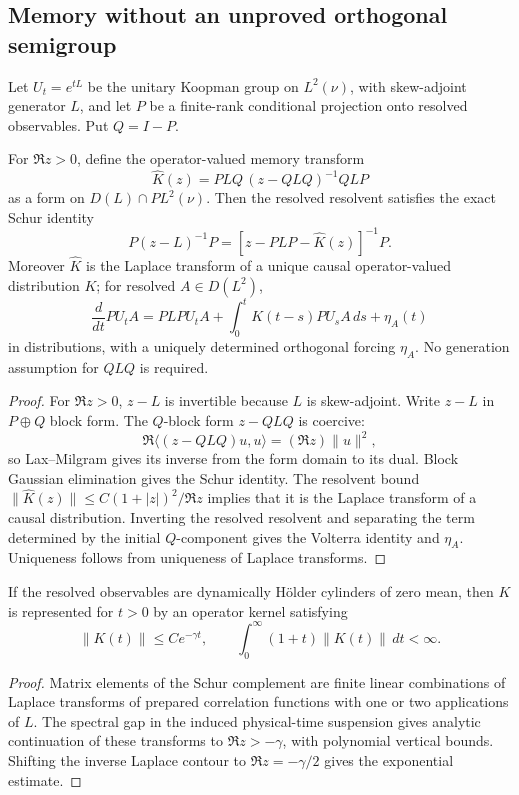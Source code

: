\subsection{Memory without an unproved orthogonal semigroup}

Let \(U_t=e^{tL}\) be the unitary Koopman group on \(L^2(\nu)\), with
skew-adjoint generator \(L\), and let \(P\) be a finite-rank conditional
projection onto resolved observables.  Put \(Q=I-P\).

\begin{theorem}
\label{thm:rr2-a4-resolvent-memory}
For \(\Re z>0\), define the operator-valued memory transform
\[
 \widehat K(z)=PLQ\,(z-QLQ)^{-1}QLP
\]
as a form on \(D(L)\cap PL^2(\nu)\).  Then the resolved resolvent satisfies
the exact Schur identity
\[
 P(z-L)^{-1}P
 =
 \left[z-PLP-\widehat K(z)\right]^{-1}P.
\]
Moreover \(\widehat K\) is the Laplace transform of a unique causal
operator-valued distribution \(K\); for resolved \(A\in D(L^2)\),
\[
 \frac d{dt}PU_tA
 =
 PLPU_tA+\int_0^tK(t-s)PU_sA\,ds+\eta_A(t)
\]
in distributions, with a uniquely determined orthogonal forcing
\(\eta_A\).  No generation assumption for \(QLQ\) is required.
\end{theorem}

\begin{proof}
For \(\Re z>0\), \(z-L\) is invertible because \(L\) is skew-adjoint.
Write \(z-L\) in \(P\oplus Q\) block form.  The \(Q\)-block form
\(z-QLQ\) is coercive:
\[
 \Re\langle (z-QLQ)u,u\rangle=(\Re z)\|u\|^2,
\]
so Lax--Milgram gives its inverse from the form domain to its dual.
Block Gaussian elimination gives the Schur identity.  The resolvent bound
\(\|\widehat K(z)\|\le C(1+|z|)^2/\Re z\) implies that it is the Laplace
transform of a causal distribution.  Inverting the resolved resolvent and
separating the term determined by the initial \(Q\)-component gives the
Volterra identity and \(\eta_A\).  Uniqueness follows from uniqueness of
Laplace transforms.
\end{proof}

\begin{theorem}
\label{thm:rr2-a4-memory-decay}
If the resolved observables are dynamically Hölder cylinders of zero mean,
then \(K\) is represented for \(t>0\) by an operator kernel satisfying
\[
 \|K(t)\|\le Ce^{-\gamma t},
 \qquad
 \int_0^\infty(1+t)\|K(t)\|\,dt<\infty.
\]
\end{theorem}

\begin{proof}
Matrix elements of the Schur complement are finite linear combinations of
Laplace transforms of prepared correlation functions with one or two
applications of \(L\).  The spectral gap in the induced physical-time
suspension gives analytic continuation of these transforms to
\(\Re z>-\gamma\), with polynomial vertical bounds.  Shifting the inverse
Laplace contour to \(\Re z=-\gamma/2\) gives the exponential estimate.
\end{proof}

